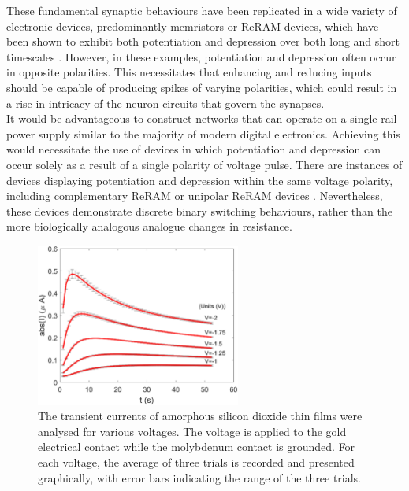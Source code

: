 \noindent These fundamental synaptic behaviours have been replicated in a wide variety of electronic devices, predominantly memristors or ReRAM devices, which have been shown to exhibit both potentiation and depression over both long and short timescales \cite{jo2010nanoscale}. However, in these examples, potentiation and depression often occur in opposite polarities. This necessitates that enhancing and reducing inputs should be capable of producing spikes of varying polarities, which could result in a rise in intricacy of the neuron circuits that govern the synapses.\\

\noindent It would be advantageous to construct networks that can operate on a single rail power supply similar to the majority of modern digital electronics. Achieving this would necessitate the use of devices in which potentiation and depression can occur solely as a result of a single polarity of voltage pulse. There are instances of devices displaying potentiation and depression within the same voltage polarity, including complementary ReRAM \cite{khan2020comparison} or unipolar ReRAM devices \cite{mehonic2012electrically}. Nevertheless, these devices demonstrate discrete binary switching behaviours, rather than the more biologically analogous analogue changes in resistance.\\


\begin{figure}[htbp!] 
    \centering    
    \includegraphics[width=0.6\textwidth]{Chapter4/Figs/e.png}
    \caption[The voltage dependence of the current transient in the subthreshold regime.]{The transient currents of amorphous silicon dioxide thin films were analysed for various voltages. The voltage is applied to the gold electrical contact while the molybdenum contact is grounded. For each voltage, the average of three trials is recorded and presented graphically, with error bars indicating the range of the three trials.}
    \label{fig:4e}
    \end{figure}
    
